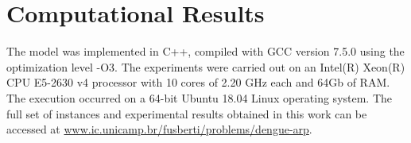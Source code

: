 \documentclass[a4paper,11pt]{article}
\newcommand{\midtilde}{\raisebox{-0.25\baselineskip}{\textasciitilde}}
\begin{document}

\section{Computational Results} \label{sec:computational-results}

The model  was implemented  in C++,  compiled with GCC  version 7.5.0  using the
optimization level -O3. The experiments were  carried out on an Intel(R) Xeon(R)
CPU E5-2630  v4 processor with 10  cores of 2.20 GHz  each and 64Gb of  RAM. The
execution occurred on a 64-bit Ubuntu 18.04 Linux operating system. The full set
of instances and  experimental results obtained in this work  can be accessed at
\href{www.ic.unicamp.br/~fusberti/problems/dengue-arp}{www.ic.unicamp.br/{\midtilde}fusberti/problems/dengue-arp}.
\end{document}
